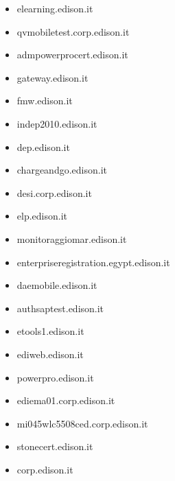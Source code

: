 \documentclass{article}
\begin{document}
\begin{itemize}
            \item elearning.edison.it
        
            \item qvmobiletest.corp.edison.it
        
            \item admpowerprocert.edison.it
        
            \item gateway.edison.it
        
            \item fmw.edison.it
        
            \item indep2010.edison.it
        
            \item dep.edison.it
        
            \item chargeandgo.edison.it
        
            \item desi.corp.edison.it
        
            \item elp.edison.it
        
            \item monitoraggiomar.edison.it
        
            \item enterpriseregistration.egypt.edison.it
        
            \item daemobile.edison.it
        
            \item authsaptest.edison.it
        
            \item etools1.edison.it
        
            \item ediweb.edison.it
        
            \item powerpro.edison.it
        
            \item ediema01.corp.edison.it
        
            \item mi045wlc5508ced.corp.edison.it
        
            \item stonecert.edison.it
        
            \item corp.edison.it
        

\end{itemize}
\end{document}
